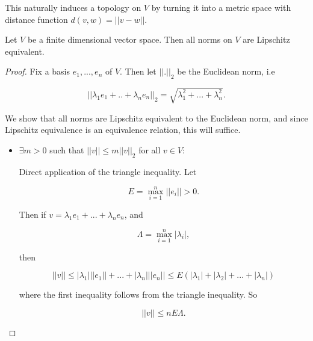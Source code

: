\documentclass[11pt]{scrartcl}
\begin{document}
\begin{remark}
This naturally induces a topology on $V$ by turning it into a metric space with distance function $d(v,w) = ||v-w||$.
\end{remark}

\begin{theorem}

Let $V$ be a finite dimensional vector space. Then all norms on $V$ are Lipschitz equivalent.

\begin{proof}

Fix a basis $e_1, ... , e_n$ of $V$. Then let $||.||_2$ be the Euclidean norm, i.e

\begin{equation}
    ||\lambda_1 e_1 + .. + \lambda_n e_n||_2 = \sqrt{ \lambda_1^2 + ... + \lambda_n^2 }.
\end{equation}

We show that all norms are Lipschitz equivalent to the Euclidean norm, and since Lipschitz equivalence is an equivalence relation, this will suffice.

\begin{itemize}
    \item $\exists m > 0$ such that $||v|| \le m ||v||_2$ for all $v \in V$:
    
    Direct application of the triangle inequality. Let 

    \begin{equation}
        E = \max_{i=1}^n ||e_i|| > 0.
    \end{equation}

    Then if $v = \lambda_1 e_1 + ... + \lambda_n e_n$, and

    \begin{equation}
        \Lambda = \max_{i=1}^n |\lambda_i|,
    \end{equation}

    then 

    \begin{equation}
        ||v|| \le |\lambda_1| ||e_1|| + ... + |\lambda_n| ||e_n|| \le E (|\lambda_1| + |\lambda_2| + ... + |\lambda_n|)
    \end{equation}

    where the first inequality follows from the triangle inequality. So

    \begin{equation}
        ||v|| \le nE\Lambda.
    \end{equation}


\end{itemize}
\end{proof}
\end{theorem}
\end{document}
